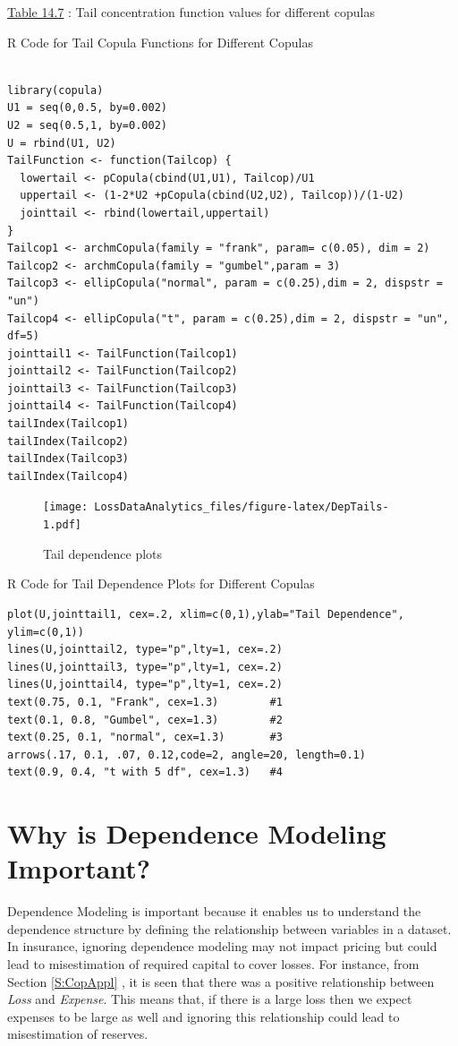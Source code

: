 \documentclass[]{book}
\theoremstyle{definition}
\theoremstyle{definition}
\theoremstyle{definition}
\theoremstyle{remark}
\begin{document}
\protect\hyperlink{tab:14.7}{Table 14.7} : Tail concentration function
values for different copulas

R Code for Tail Copula Functions for Different Copulas

\hypertarget{display.Sim.2}{}
\begin{verbatim}

library(copula)
U1 = seq(0,0.5, by=0.002)
U2 = seq(0.5,1, by=0.002)
U = rbind(U1, U2)
TailFunction <- function(Tailcop) {
  lowertail <- pCopula(cbind(U1,U1), Tailcop)/U1
  uppertail <- (1-2*U2 +pCopula(cbind(U2,U2), Tailcop))/(1-U2)
  jointtail <- rbind(lowertail,uppertail)
}
Tailcop1 <- archmCopula(family = "frank", param= c(0.05), dim = 2)
Tailcop2 <- archmCopula(family = "gumbel",param = 3)
Tailcop3 <- ellipCopula("normal", param = c(0.25),dim = 2, dispstr = "un")
Tailcop4 <- ellipCopula("t", param = c(0.25),dim = 2, dispstr = "un", df=5)
jointtail1 <- TailFunction(Tailcop1)
jointtail2 <- TailFunction(Tailcop2)
jointtail3 <- TailFunction(Tailcop3)
jointtail4 <- TailFunction(Tailcop4)
tailIndex(Tailcop1)
tailIndex(Tailcop2)
tailIndex(Tailcop3)
tailIndex(Tailcop4)
\end{verbatim}

\begin{figure}
\centering
\texttt{[image: LossDataAnalytics\_files/figure-latex/DepTails-1.pdf]}
\caption{\label{fig:DepTails}Tail dependence plots}
\end{figure}

R Code for Tail Dependence Plots for Different Copulas

\hypertarget{display.Sim.2}{}
\begin{verbatim}
plot(U,jointtail1, cex=.2, xlim=c(0,1),ylab="Tail Dependence", ylim=c(0,1))
lines(U,jointtail2, type="p",lty=1, cex=.2)
lines(U,jointtail3, type="p",lty=1, cex=.2)
lines(U,jointtail4, type="p",lty=1, cex=.2)
text(0.75, 0.1, "Frank", cex=1.3)        #1
text(0.1, 0.8, "Gumbel", cex=1.3)        #2
text(0.25, 0.1, "normal", cex=1.3)       #3
arrows(.17, 0.1, .07, 0.12,code=2, angle=20, length=0.1)
text(0.9, 0.4, "t with 5 df", cex=1.3)   #4
\end{verbatim}

\section{Why is Dependence Modeling Important?}\label{S:CopImp}

Dependence Modeling is important because it enables us to understand the
dependence structure by defining the relationship between variables in a
dataset. In insurance, ignoring dependence modeling may not impact
pricing but could lead to misestimation of required capital to cover
losses. For instance, from Section \ref{S:CopAppl} , it is seen that
there was a positive relationship between \emph{Loss} and
\emph{Expense}. This means that, if there is a large loss then we expect
expenses to be large as well and ignoring this relationship could lead
to misestimation of reserves.
\end{document}
